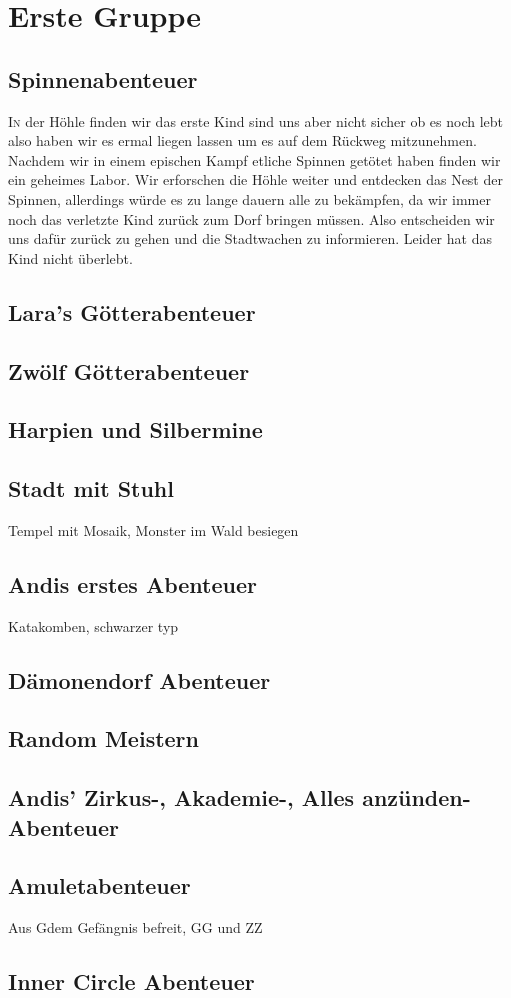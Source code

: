 \chapter{Erste Gruppe}
\section{Spinnenabenteuer}
\lettrine{I}{n} der H\"ohle finden wir das erste Kind sind uns aber nicht sicher ob es noch lebt also haben wir es ermal liegen lassen um es auf dem R\"uckweg mitzunehmen. Nachdem wir in einem epischen Kampf etliche Spinnen get\"otet haben finden wir ein geheimes Labor. Wir erforschen die H\"ohle weiter und entdecken das Nest der Spinnen, allerdings w\"urde es zu lange dauern alle zu bek\"ampfen, da wir immer noch das verletzte Kind zur\"uck zum Dorf bringen m\"ussen. Also entscheiden wir uns daf\"ur zur\"uck zu gehen und die Stadtwachen zu informieren. Leider hat das Kind nicht \"uberlebt.

\section{Lara's G\"otterabenteuer}
\section{Zw\"olf G\"otterabenteuer}
\section{Harpien und Silbermine}
\section{Stadt mit Stuhl}
Tempel mit Mosaik, Monster im Wald besiegen
\section{Andis erstes Abenteuer}
Katakomben, schwarzer typ
\section{D\"amonendorf Abenteuer}
\section{Random Meistern}
\section{Andis' Zirkus-, Akademie-, Alles anz\"unden-Abenteuer}
\section{Amuletabenteuer}
Aus Gdem Gef\"angnis befreit, GG und ZZ
\section{Inner Circle Abenteuer}